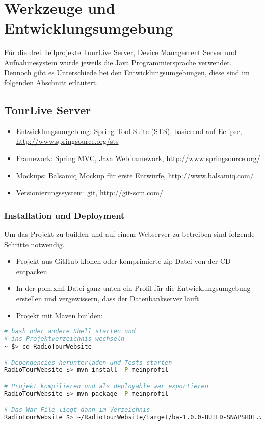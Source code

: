\section{Werkzeuge und Entwicklungsumgebung}
\label{sec:wekzeugeundentwicklungsumgebung}
Für die drei Teilprojekte TourLive Server, Device Management Server und Aufnahmesystem wurde jeweils die Java Programmiersprache verwendet. Dennoch gibt es Unterschiede bei den Entwicklungsumgebungen, diese sind im folgenden Abschnitt erläutert.

\subsection{TourLive Server}
\begin{itemize}
\item Entwicklungsumgebung: Spring Tool Suite (STS), basierend auf Eclipse, \url{http://www.springsource.org/sts}
\item Framework: Spring MVC, Java Webframework, \url{http://www.springsource.org/}
\item Mockups: Balsamiq Mockup für erste Entwürfe, \url{http://www.balsamiq.com/}
\item Versionierungssystem: git, \url{http://git-scm.com/}
\end{itemize}

\subsubsection{Installation und Deployment}
\label{sec:installationdeploymenttourliveserver}
Um das Projekt zu builden und auf einem Webserver zu betreiben sind folgende Schritte notwendig.

\begin{itemize}
\item Projekt aus GitHub klonen oder komprimierte zip Datei von der CD entpacken
\item In der pom.xml Datei ganz unten ein Profil für die Entwicklungsumgebung erstellen und vergewissern, dass der Datenbankserver läuft
\item Projekt mit Maven builden:
\end{itemize}

\begin{lstlisting}[language=Bash, caption=Build und Test mit Maven]
# bash oder andere Shell starten und
# ins Projektverzeichnis wechseln
~ $> cd RadioTourWebsite

# Dependencies herunterladen und Tests starten
RadioTourWebsite $> mvn install -P meinprofil

# Projekt kompilieren und als deployable war exportieren
RadioTourWebsite $> mvn package -P meinprofil

# Das War File liegt dann im Verzeichnis
RadioTourWebsite $> ~/RadioTourWebsite/target/ba-1.0.0-BUILD-SNAPSHOT.war

\end{lstlisting}

